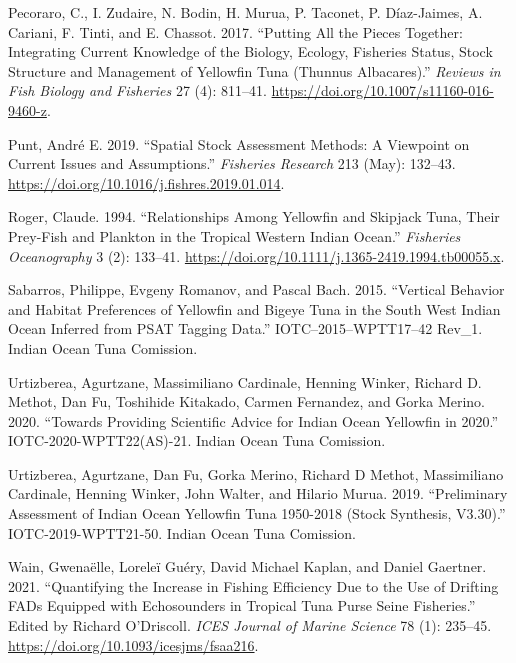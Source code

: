 \documentclass[
]{scrartcl}
\newlength{\cslhangindent}
\newenvironment{CSLReferences}[2] %
 {\begin{list}{}{%
  \setlength{\itemindent}{0pt}
  \setlength{\leftmargin}{0pt}
  \setlength{\parsep}{0pt}
  \ifodd #1
   \setlength{\leftmargin}{\cslhangindent}
   \setlength{\itemindent}{-1\cslhangindent}
  \fi
  \setlength{\itemsep}{#2\baselineskip}}}
 {\end{list}}
\begin{document}
\begin{CSLReferences}{1}{0}
Pecoraro, C., I. Zudaire, N. Bodin, H. Murua, P. Taconet, P.
Díaz-Jaimes, A. Cariani, F. Tinti, and E. Chassot. 2017. {``Putting All
the Pieces Together: Integrating Current Knowledge of the Biology,
Ecology, Fisheries Status, Stock Structure and Management of Yellowfin
Tuna ({Thunnus} Albacares).''} \emph{Reviews in Fish Biology and
Fisheries} 27 (4): 811--41.
\url{https://doi.org/10.1007/s11160-016-9460-z}.

Punt, André E. 2019. {``Spatial Stock Assessment Methods: {A} Viewpoint
on Current Issues and Assumptions.''} \emph{Fisheries Research} 213
(May): 132--43. \url{https://doi.org/10.1016/j.fishres.2019.01.014}.

Roger, Claude. 1994. {``Relationships Among Yellowfin and Skipjack Tuna,
Their Prey-Fish and Plankton in the Tropical Western {Indian Ocean}.''}
\emph{Fisheries Oceanography} 3 (2): 133--41.
\url{https://doi.org/10.1111/j.1365-2419.1994.tb00055.x}.

Sabarros, Philippe, Evgeny Romanov, and Pascal Bach. 2015. {``Vertical
Behavior and Habitat Preferences of Yellowfin and Bigeye Tuna in the
{South West Indian Ocean} Inferred from {PSAT} Tagging Data.''}
IOTC--2015--WPTT17--42 Rev\_1. Indian Ocean Tuna Comission.

Urtizberea, Agurtzane, Massimiliano Cardinale, Henning Winker, Richard
D. Methot, Dan Fu, Toshihide Kitakado, Carmen Fernandez, and Gorka
Merino. 2020. {``Towards Providing Scientific Advice for {Indian Ocean}
Yellowfin in 2020.''} IOTC-2020-WPTT22(AS)-21. Indian Ocean Tuna
Comission.

Urtizberea, Agurtzane, Dan Fu, Gorka Merino, Richard D Methot,
Massimiliano Cardinale, Henning Winker, John Walter, and Hilario Murua.
2019. {``Preliminary Assessment of {Indian Ocean} Yellowfin Tuna
1950-2018 ({Stock Synthesis}, V3.30).''} IOTC-2019-WPTT21-50. Indian
Ocean Tuna Comission.

Wain, Gwenaëlle, Loreleï Guéry, David Michael Kaplan, and Daniel
Gaertner. 2021. {``Quantifying the Increase in Fishing Efficiency Due to
the Use of Drifting {FADs} Equipped with Echosounders in Tropical Tuna
Purse Seine Fisheries.''} Edited by Richard O'Driscoll. \emph{ICES
Journal of Marine Science} 78 (1): 235--45.
\url{https://doi.org/10.1093/icesjms/fsaa216}.


\end{CSLReferences}
\end{document}
